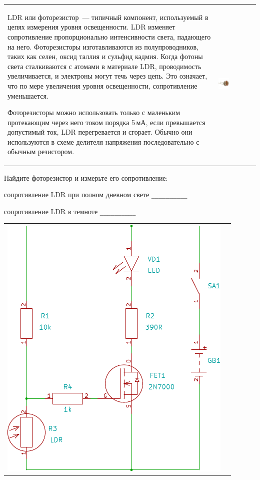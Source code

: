
\begin{tabular}{p{} l}
\parbox[b]{0.62\textwidth}{
LDR или фоторезистор\ --- типичный компонент,
используемый в цепях измерения уровня освещенности. LDR изменяет сопротивление
пропорционально интенсивности света, падающего на него. Фоторезисторы
изготавливаются из полупроводников, таких как селен, оксид таллия и сульфид
кадмия. Когда фотоны света сталкиваются с атомами в материале LDR, проводимость
увеличивается, и электроны могут течь через цепь. Это означает, что по мере
увеличения уровня освещенности, сопротивление уменьшается.

\bigskip
Фоторезисторы можно использовать только с маленьким протекающим через него током
порядка 5\,мА, если превышается допустимый ток, LDR перегревается и сгорает.
Обычно они используются в схеме делителя напряжения последовательно с обычным
резистором.
}
&
\includegraphics[width=0.3\textwidth]{bcollis/LDR.jpg}
\end{tabular}
\bigskip

Найдите фоторезистор и измерьте его сопротивление:

сопротивление LDR при полном дневном свете \verb|__________|

сопротивление LDR в темноте \verb|__________|

\bigskip
\begin{tabular}{l l}
\includegraphics[height=0.65\textheight]{bcollis/ldr/ldr.pdf}
&\\
\end{tabular}
\bigskip

